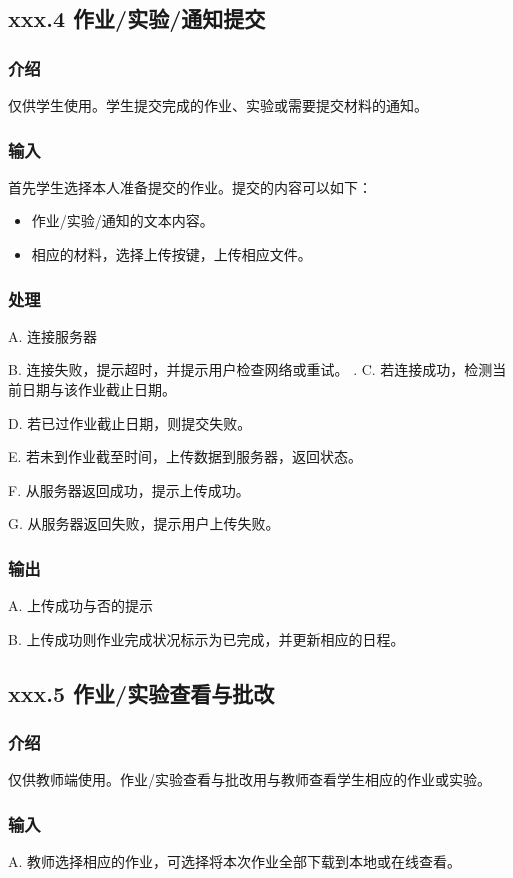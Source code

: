 \subsection{xxx.4 作业/实验/通知提交}
  \subsubsection{介绍}
仅供学生使用。学生提交完成的作业、实验或需要提交材料的通知。
\subsubsection{输入}
首先学生选择本人准备提交的作业。提交的内容可以如下：
\begin{itemize}
    \item 作业/实验/通知的文本内容。
    \item 相应的材料，选择上传按键，上传相应文件。
  \end{itemize}
\subsubsection{处理}
A. 连接服务器

B. 连接失败，提示超时，并提示用户检查网络或重试。
.
C. 若连接成功，检测当前日期与该作业截止日期。

D. 若已过作业截止日期，则提交失败。

E. 若未到作业截至时间，上传数据到服务器，返回状态。

F. 从服务器返回成功，提示上传成功。

G. 从服务器返回失败，提示用户上传失败。

\subsubsection{输出}
A. 上传成功与否的提示

B. 上传成功则作业完成状况标示为已完成，并更新相应的日程。

\subsection{xxx.5 作业/实验查看与批改}
  \subsubsection{介绍}
仅供教师端使用。作业/实验查看与批改用与教师查看学生相应的作业或实验。
\subsubsection{输入}
A. 教师选择相应的作业，可选择将本次作业全部下载到本地或在线查看。

